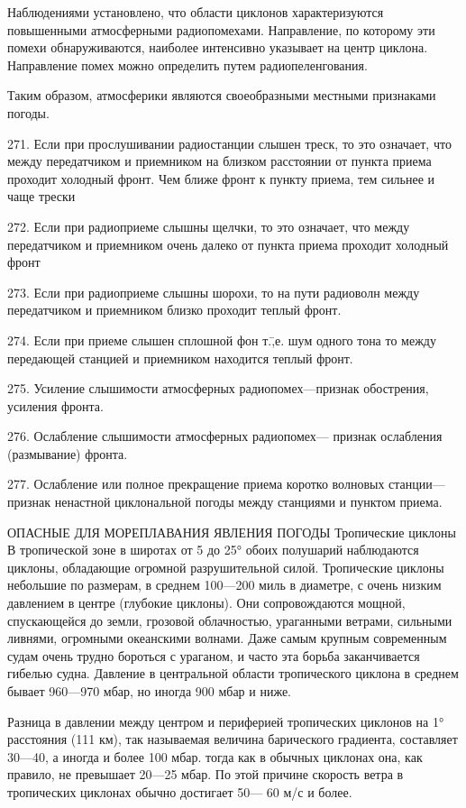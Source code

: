 Наблюдениями установлено, что области циклонов характеризуются повышенными атмосферными радиопомехами. Направление, по которому эти помехи обнаруживаются, наиболее интенсивно указывает на центр циклона. Направление помех можно определить путем радиопеленгования.

Таким образом, атмосферики являются своеобразными местными признаками погоды.

271. Если при прослушивании радиостанции слышен треск, то это означает, что между передатчиком и приемником на близком расстоянии от пункта приема проходит холодный фронт. Чем ближе фронт к пункту приема, тем сильнее и чаще трески

272. Если при радиоприеме слышны щелчки, то это означает, что между передатчиком и приемником очень далеко от пункта приема проходит холодный фронт

273. Если при радиоприеме слышны шорохи, то на пути радиоволн между передатчиком и приемником близко проходит теплый фронт.

274. Если при приеме слышен сплошной фон т.\=,е. шум одного тона то между передающей станцией и приемником находится теплый фронт.

275. Усиление слышимости атмосферных радиопомех—признак обострения, усиления фронта.

276. Ослабление слышимости атмосферных радиопомех— признак ослабления (размывание) фронта.

277. Ослабление или полное прекращение приема коротко волновых станции—признак ненастной циклональной погоды между станциями и пунктом приема.

ОПАСНЫЕ ДЛЯ МОРЕПЛАВАНИЯ ЯВЛЕНИЯ ПОГОДЫ
Тропические циклоны
В тропической зоне в широтах от 5 до 25° обоих полушарий наблюдаются циклоны, обладающие огромной разрушительной силой. Тропические циклоны небольшие по размерам, в среднем 100—200 миль в диаметре, с очень низким давлением в центре (глубокие циклоны). Они сопровождаются мощной, спускающейся до земли, грозовой облачностью, ураганными ветрами, сильными ливнями, огромными океанскими волнами. Даже самым крупным современным судам очень трудно бороться с ураганом, и часто эта борьба заканчивается гибелью судна. Давление в центральной области тропического циклона в среднем бывает 960—970 мбар, но иногда 900 мбар и ниже.

Разница в давлении между центром и периферией тропических циклонов на 1° расстояния (111 км), так называемая величина барического градиента, составляет 30—40, а иногда и более 100 мбар. тогда как в обычных циклонах она, как правило, не превышает 20—25 мбар. По этой причине скорость ветра в тропических циклонах обычно достигает 50— 60 м/с и более.

